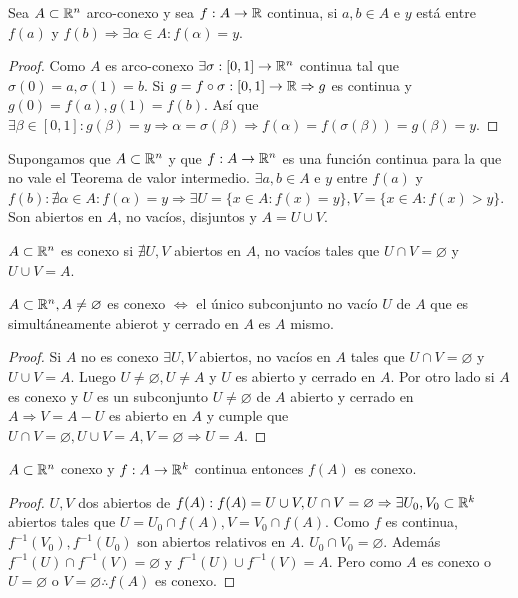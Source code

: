 \begin{prop}
  Sea $A \subset \mathbb{R}^n$ arco-conexo y sea $f: A \to \mathbb{R}$ continua, si $a, b \in A$ e $y$ está entre $f(a)$ y $f(b) \Rightarrow \exists \alpha \in A : f(\alpha) = y$.
  \begin{proof}
    Como $A$ es arco-conexo $\exists \sigma: [0, 1] \to \mathbb{R}^n$ continua tal que $\sigma(0) = a, \sigma(1) = b$. Si $g = f \circ \sigma: [0, 1] \to \mathbb{R} \Rightarrow g$ es continua y $g(0) = f(a), g(1) = f(b)$. Así que $\exists \beta \in [0, 1] : g(\beta) = y \Rightarrow \alpha = \sigma(\beta) \Rightarrow f(\alpha) = f(\sigma(\beta)) = g(\beta) = y$.
  \end{proof}
\end{prop}

\begin{note}
  Supongamos que $A \subset \mathbb{R}^n$ y que $f: A \to \mathbb{R}^n$ es una función continua para la que no vale el Teorema de valor intermedio. $\exists a, b \in A$ e $y$ entre $f(a)$ y $f(b) : \nexists \alpha \in A : f(\alpha) = y \Rightarrow \exists U = \{ x \in A : f(x) = y \}, V = \{ x \in A : f(x) > y \}$. Son abiertos en $A$, no vacíos, disjuntos y $A = U \cup V$.
\end{note}

\begin{definition}[Conexo]
  $A \subset \mathbb{R}^n$ es conexo si $\nexists U, V$ abiertos en $A$, no vacíos tales que $U \cap V = \varnothing$ y $U \cup V = A$.
\end{definition}

\begin{prop}
  $A \subset \mathbb{R}^n, A \neq \varnothing$ es conexo $\iff$ el único subconjunto no vacío $U$ de $A$ que es simultáneamente abierot y cerrado en $A$ es $A$ mismo.
  \begin{proof}
    Si $A$ no es conexo $\exists U, V$ abiertos, no vacíos en $A$ tales que $U \cap V = \varnothing$ y $U \cup V = A$. Luego $U \neq \varnothing, U \neq A$ y $U$ es abierto y cerrado en $A$. Por otro lado si $A$ es conexo y $U$ es un subconjunto $U \neq \varnothing$ de $A$ abierto y cerrado en $A \Rightarrow V = A - U$ es abierto en $A$ y cumple que $U \cap V = \varnothing, U \cup V = A, V = \varnothing \Rightarrow U = A$.
  \end{proof}
\end{prop}

\clearpage

\begin{theorem}
  $A \subset \mathbb{R}^n$ conexo y $f: A \to \mathbb{R}^k$ continua entonces $f(A)$ es conexo.
  \begin{proof}
    $U, V$ dos abiertos de $f(A) : f(A) = U \cup V, U \cap V = \varnothing \Rightarrow \exists U_0, V_0 \subset \mathbb{R}^k$ abiertos tales que $U = U_0 \cap f(A), V = V_0 \cap f(A)$. Como $f$ es continua, $f^{-1}(V_0), f^{-1}(U_0)$ son abiertos relativos en $A$. $U_0 \cap V_0 = \varnothing$. Además $f^{-1}(U) \cap f^{-1}(V) = \varnothing$ y $f^{-1}(U) \cup f^{-1}(V) = A$. Pero como $A$ es conexo o $ U = \varnothing$ o $V = \varnothing \therefore f(A)$ es conexo.
  \end{proof}
\end{theorem}

